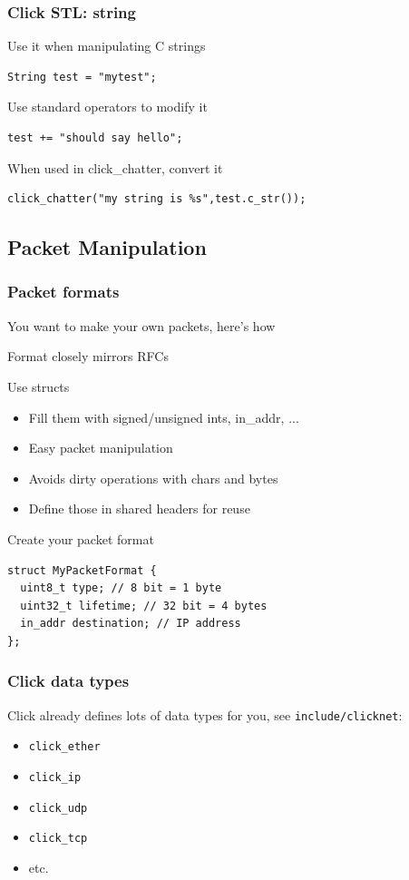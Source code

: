 \documentclass{beamer}
\begin{document}
\begin{frame}[fragile]
\frametitle{Click STL: string}
Use it when manipulating C strings
\begin{lstlisting}
String test = "mytest";
\end{lstlisting}
Use standard operators to modify it
\begin{lstlisting}
test += "should say hello";
\end{lstlisting}
When used in click\_chatter, convert it
\begin{lstlisting}
click_chatter("my string is %s",test.c_str());
\end{lstlisting}
\end{frame}

\subsection{Packet Manipulation} %
\label{sub:packet_manipulation}

\begin{frame}[fragile]
\frametitle{Packet formats}
You want to make your own packets, here's how

Format closely mirrors RFCs

Use structs
\begin{itemize}
	\item Fill them with signed/unsigned ints, in\_addr, ...
	\item Easy packet manipulation
	\item Avoids dirty operations with chars and bytes
	\item Define those in shared headers for reuse
\end{itemize}
Create your packet format
\begin{lstlisting}
struct MyPacketFormat {
  uint8_t type; // 8 bit = 1 byte
  uint32_t lifetime; // 32 bit = 4 bytes
  in_addr destination; // IP address
};
\end{lstlisting}
\end{frame}

\begin{frame}[fragile]
\frametitle{Click data types}
Click already defines lots of data types for you, see \lstinline!include/clicknet!:
\begin{itemize}
	\item \lstinline!click_ether!
	\item \lstinline!click_ip   !
	\item \lstinline!click_udp  !
	\item \lstinline!click_tcp  !
	\item etc. 
\end{itemize}
\end{frame}
\end{document}
